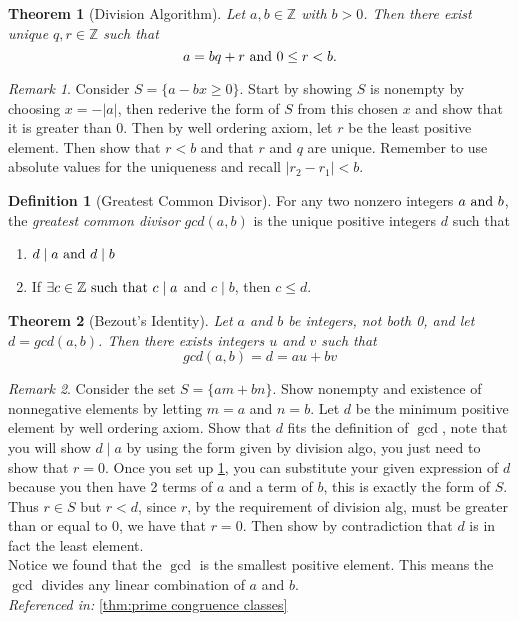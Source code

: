 \documentclass{article}
\newtheorem{theorem}{Theorem}[section]
\theoremstyle{definition}
\newtheorem{definition}{Definition}[section]
\theoremstyle{remark}
\newtheorem{remark}{Remark}[section]
\begin{document}
\begin{theorem}[Division Algorithm]\label{thm:division_algorithim}
Let \(a,b \in \mathbb{Z}\) with \(b>0\). Then there exist unique \(q,r \in \mathbb{Z}\) such that \[
a = bq+r \textnormal{ and } 0 \leq r < b.
\]
\end{theorem}

\begin{remark}
Consider $S = \{a-bx \geq 0 \}$. Start by showing $S$ is nonempty 
by choosing $x = -|a|$, then rederive the form of $S$ from this chosen $x$ and 
show that it is greater than 0. Then by well ordering axiom, let $r$ be the 
least positive element. Then show that $r<b$ and that $r$ and $q$ are unique.
Remember to use absolute values for the uniqueness and recall $|r_2 - r_1| < b$.
\end{remark}





\begin{definition}[Greatest Common Divisor]\label{def:gcd}
For any two nonzero integers \(a \textnormal{ and } b\), the \textit{greatest common divisor} \(gcd(a,b)\) is the unique positive integers \(d\) such that
\begin{enumerate}
\item \(d \mid a \textnormal{ and } d \mid b\)
\item If \( \exists c \in \mathbb{Z} \textnormal{ such that } c \mid a \) and \(c \mid b\), then \(c \leq d\).
\end{enumerate}

\end{definition}






\begin{theorem}[Bezout's Identity]\label{thm:bezout_identity}
Let \(a\) and \(b\) be integers, not both 0, and let \(d = gcd(a,b)\). Then there exists integers \(u\) and \(v\) such that \[
gcd(a,b) = d = au + bv
\]  
\end{theorem}
\begin{remark}
Consider the set $S = \{am + bn\}$. Show nonempty and existence of nonnegative elements
by letting $m=a$ and $n=b$. Let $d$ be the minimum positive element by well ordering axiom.
Show that $d$ fits the definition of $\gcd$, note that you will
show $d\mid a$ by using the form given by division algo, you just need to show that $r=0$. 
Once you set up \ref{thm:division_algorithim}, you can substitute your given expression of $d$ because
you then have 2 terms of $a$ and a term of $b$, this is exactly the form of $S$. Thus $r\in S$ but
$r<d$, since $r$, by the requirement of division alg, must be greater than or equal to 0, 
we have that $r=0$. 
Then show by contradiction that $d$ is in fact the least element. \\
Notice we found that the $\gcd$ is the smallest positive element. This means
the $\gcd$ divides any linear combination of $a$ and $b$.\\
\vspace{1cm} \textit{Referenced in:} \ref{thm:prime congruence classes}
\end{remark}
\end{document}
